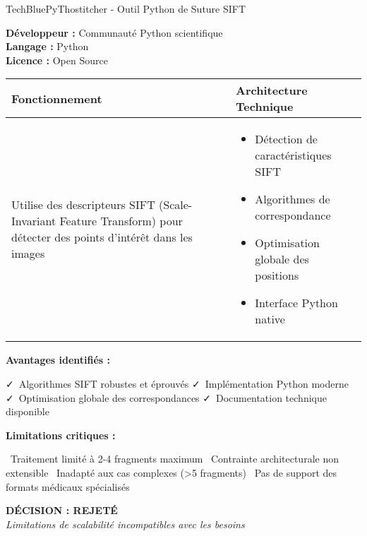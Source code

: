 \documentclass[12pt,a4paper]{report}
\newcommand{\pro}[1]{\textcolor{SuccessGreen}{\faCheck\ #1}}
\newcommand{\con}[1]{\textcolor{DangerRed}{\faTimes\ #1}}
\begin{document}
\begin{techbox}{TechBlue}{PyThostitcher - Outil Python de Suture SIFT}

\textbf{Développeur :} Communauté Python scientifique \\
\textbf{Langage :} Python \\
\textbf{Licence :} Open Source

\vspace{0.5cm}

\begin{tabularx}{\textwidth}{|X|X|}
\hline
\rowcolor{LightGray}
\textbf{Fonctionnement} & \textbf{Architecture Technique} \\
\hline
Utilise des descripteurs SIFT (Scale-Invariant Feature Transform) pour détecter des points d'intérêt dans les images & 
\begin{itemize}[nosep]
\item Détection de caractéristiques SIFT
\item Algorithmes de correspondance
\item Optimisation globale des positions
\item Interface Python native
\end{itemize} \\
\hline
\end{tabularx}

\vspace{0.5cm}

\textbf{Avantages identifiés :}
\begin{itemize}[leftmargin=*]
    \pro{Algorithmes SIFT robustes et éprouvés}
    \pro{Implémentation Python moderne}
    \pro{Optimisation globale des correspondances}
    \pro{Documentation technique disponible}
\end{itemize}

\textbf{Limitations critiques :}
\begin{itemize}[leftmargin=*]
    \con{Traitement limité à 2-4 fragments maximum}
    \con{Contrainte architecturale non extensible}
    \con{Inadapté aux cas complexes (>5 fragments)}
    \con{Pas de support des formats médicaux spécialisés}
\end{itemize}

\begin{center}
\textbf{\textcolor{DangerRed}{DÉCISION : REJETÉ}}\\
\textit{Limitations de scalabilité incompatibles avec les besoins}
\end{center}

\end{techbox}
\end{document}

